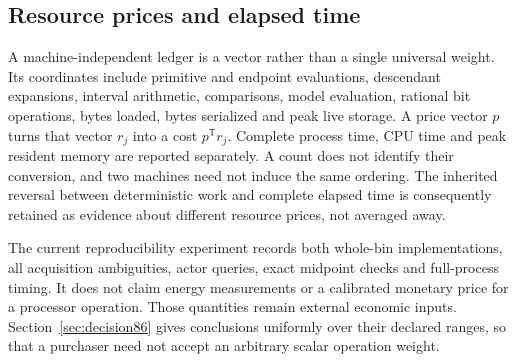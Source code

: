 \subsection{Resource prices and elapsed time}
A machine-independent ledger is a vector rather than a single universal weight. Its coordinates include primitive and endpoint evaluations, descendant expansions, interval arithmetic, comparisons, model evaluation, rational bit operations, bytes loaded, bytes serialized and peak live storage. A price vector $p$ turns that vector $r_j$ into a cost $p^{\mathsf T}r_j$. Complete process time, CPU time and peak resident memory are reported separately. A count does not identify their conversion, and two machines need not induce the same ordering. The inherited reversal between deterministic work and complete elapsed time is consequently retained as evidence about different resource prices, not averaged away.

The current reproducibility experiment records both whole-bin implementations, all acquisition ambiguities, actor queries, exact midpoint checks and full-process timing. It does not claim energy measurements or a calibrated monetary price for a processor operation. Those quantities remain external economic inputs. Section~\ref{sec:decision86} gives conclusions uniformly over their declared ranges, so that a purchaser need not accept an arbitrary scalar operation weight.
